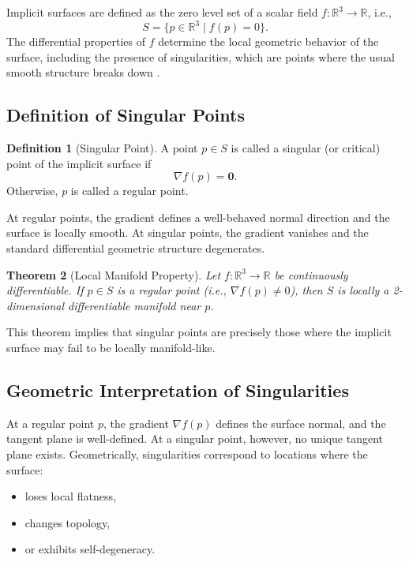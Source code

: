 \documentclass[12pt, a4paper, oneside]{book}
\theoremstyle{plain}
\newtheorem{theorem}{Theorem}[chapter]
\theoremstyle{definition}
\newtheorem{definition}[theorem]{Definition}
\theoremstyle{remark}
\theoremstyle{definition}
\begin{document}
Implicit surfaces are defined as the zero level set of a scalar field $f:\mathbb{R}^3 \rightarrow \mathbb{R}$, i.e.,
\[
S = \{ p \in \mathbb{R}^3 \mid f(p) = 0 \}.
\]
The differential properties of $f$ determine the local geometric behavior of the surface, including the presence of singularities, which are points where the usual smooth structure breaks down \cite{bloomenthal2000implicit}.

\subsection{Definition of Singular Points}

\begin{definition}[Singular Point]
A point $p \in S$ is called a singular (or critical) point of the implicit surface if
\[
\nabla f(p) = \mathbf{0}.
\]
Otherwise, $p$ is called a regular point.
\end{definition}

At regular points, the gradient defines a well-behaved normal direction and the surface is locally smooth. At singular points, the gradient vanishes and the standard differential geometric structure degenerates.

\begin{theorem}[Local Manifold Property]
Let $f:\mathbb{R}^3 \rightarrow \mathbb{R}$ be continuously differentiable. If $p \in S$ is a regular point (i.e., $\nabla f(p) \neq 0$), then $S$ is locally a 2-dimensional differentiable manifold near $p$.
\end{theorem}

This theorem implies that singular points are precisely those where the implicit surface may fail to be locally manifold-like.

\subsection{Geometric Interpretation of Singularities}

At a regular point $p$, the gradient $\nabla f(p)$ defines the surface normal, and the tangent plane is well-defined. At a singular point, however, no unique tangent plane exists. Geometrically, singularities correspond to locations where the surface:
\begin{itemize}
    \item loses local flatness,
    \item changes topology,
    \item or exhibits self-degeneracy.
\end{itemize}
\end{document}

